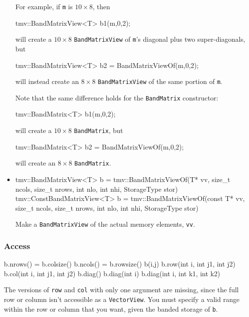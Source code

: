 \documentclass[twoside,letterpaper,11pt]{article}
\renewcommand{\tt}[1]{{\lstinline {#1}}}
\begin{document}
\begin{itemize}
For example, if \tt{m} is $10 \times 8$, then 
\begin{tmvcode}
tmv::BandMatrixView<T> b1(m,0,2);
\end{tmvcode}
will create a $10 \times 8$ \tt{BandMatrixView} of \tt{m}'s diagonal plus two super-diagonals, but
\begin{tmvcode}
tmv::BandMatrixView<T> b2 = BandMatrixViewOf(m,0,2);
\end{tmvcode}
will instead create an $8 \times 8$ \tt{BandMatrixView} of the same portion of \tt{m}.

Note that the same difference holds for the \tt{BandMatrix} constructor:
\begin{tmvcode}
tmv::BandMatrix<T> b1(m,0,2);
\end{tmvcode}
will create a $10 \times 8$ \tt{BandMatrix}, but
\begin{tmvcode}
tmv::BandMatrix<T> b2 = BandMatrixViewOf(m,0,2);
\end{tmvcode}
will create an $8 \times 8$ \tt{BandMatrix}.

\item
\begin{tmvcode}
tmv::BandMatrixView<T> b = 
      tmv::BandMatrixViewOf(T* vv, size_t ncols, size_t nrows, 
          int nlo, int nhi, StorageType stor)
tmv::ConstBandMatrixView<T> b = 
      tmv::BandMatrixViewOf(const T* vv, size_t ncols, size_t nrows, 
          int nlo, int nhi, StorageType stor)
\end{tmvcode}
Make a \tt{BandMatrixView} of the actual memory elements, \tt{vv}.

\end{itemize}

\subsubsection{Access}

\begin{tmvcode}
b.nrows() = b.colsize()
b.ncols() = b.rowsize()
b(i,j)
b.row(int i, int j1, int j2)
b.col(int i, int j1, int j2)
b.diag()
b.diag(int i)
b.diag(int i, int k1, int k2)
\end{tmvcode}
The versions of \tt{row} and \tt{col} with only one argument are
missing, since the full row or column isn't accessible as a \tt{VectorView}.
You must specify a valid range within the row or column that you want, 
given the banded storage of \tt{b}.
\end{document}

